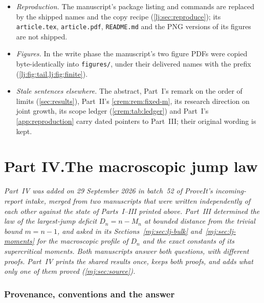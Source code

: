 \documentclass[11pt,a4paper]{article}
\theoremstyle{definition}\newaliascnt{definition}{theorem}
\theoremstyle{remark}\newaliascnt{remark}{theorem}
\begin{document}
\begin{itemize}
 bibliography.
\item \emph{Reproduction.} The manuscript's package listing and commands are
 replaced by the shipped names and the copy recipe
 (\cref{lj:sec:reproduce}); its \texttt{article.tex}, \texttt{article.pdf},
 \texttt{README.md} and the PNG versions of its figures are not shipped.
\item \emph{Figures.} In the write phase the manuscript's two figure PDFs
 were copied byte-identically into \texttt{figures/}, under their delivered
 names with the prefix 
 (\cref{lj:fig:tail,lj:fig:finite}).
\item \emph{Stale sentences elsewhere.} The abstract, Part~I's remark on the
 order of limits (\cref{sec:results}), Part~II's
 \cref{crem:rem:fixed-m}, its research direction on joint growth, its
 scope ledger (\cref{crem:tab:ledger}) and Part~I's \cref{app:reproduction}
 carry dated pointers to Part~III; their original wording is kept.
\end{itemize}


\clearpage
{}\part*{Part IV.\quad The macroscopic jump law}

\noindent\emph{Part~IV was added on 29 September 2026 in batch~52 of
ProveIt's incoming-report intake, merged from two manuscripts that were
written independently of each other against the state of Parts~I--III
printed above. Part~III determined the law of the largest-jump deficit
$D_n=n-M_n$ at bounded distance from the trivial bound $m=n-1$, and asked in
its Sections~\ref{mj:sec:lj-bulk} and~\ref{mj:sec:lj-moments} for the
macroscopic profile of $D_n$ and the exact constants of its supercritical
moments. Both manuscripts answer both questions, with different proofs.
Part~IV prints the shared results once, keeps both proofs, and adds what
only one of them proved (\cref{mj:sec:source}).}

\section{Provenance, conventions and the answer}
\label{mj:sec:intro}
\end{document}
